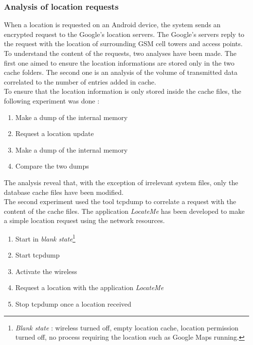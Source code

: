 \subsubsection{Analysis of location requests}

When a location is requested on an Android device, the system sends an encrypted request to the Google's location servers.
The Google's servers reply to the request with the location of surrounding GSM cell towers and access points.\\

To understand the content of the requests, two analyses have been made.
The first one aimed to ensure the location informations are stored only in the two cache folders.
The second one is an analysis of the volume of transmitted data correlated to the number of entries added in cache.\\

To ensure that the location information is only stored inside the cache files, the following experiment was done :
\begin{enumerate}
\item Make a dump of the internal memory
\item Request a location update
\item Make a dump of the internal memory
\item Compare the two dumps
\end{enumerate}

The analysis reveal that, with the exception of irrelevant system files, only the database cache files have been modified.\\

The second experiment used the tool tcpdump to correlate a request with the content of the cache files.
The application \emph{LocateMe} has been developed to make a simple location request using the network resources.

\begin{enumerate}
\item Start in \emph{blank state}\footnote{\emph{Blank state} : wireless turned off, empty location cache, location permission turned off, no process requiring the location such as Google Maps running.}
\item Start tcpdump
\item Activate the wireless
\item Request a location with the application \emph{LocateMe}
\item Stop tcpdump once a location received
\end{enumerate}

